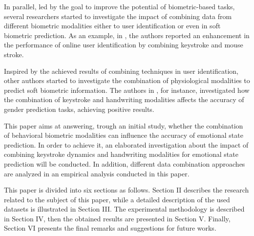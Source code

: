\documentclass[conference]{IEEEtran}
\begin{document}
In parallel, led by the goal to improve the potential of biometric-based tasks, several researchers started to investigate the impact of combining data from different biometric modalities \cite{combine} either to user identification or even in soft biometric prediction. As an example, in \cite{marjorie-comb}, the authors reported an enhancement in the performance of online user identification by combining keystroke and mouse stroke. 

Inspired by the achieved results of combining techniques in user identification, other authors started to investigate the combination of physiological modalities to predict soft biometric information. The authors in \cite{combining-gender}, for instance, investigated how the combination of keystroke and handwriting modalities affects the accuracy of gender prediction tasks, achieving positive results.

This paper aims at answering, trough an initial study, whether the combination of behavioral biometric modalities can influence the accuracy of emotional state prediction. In order to achieve it, an elaborated investigation about the impact of combining keystroke dynamics and handwriting modalities for emotional state prediction will be conducted. In addition, different data combination approaches are analyzed in an empirical analysis conducted in this paper.


This paper is divided into six sections as follows. Section II describes the research related to the subject of this paper, while a detailed description of the used datasets is illustrated in Section III. The experimental methodology is described in Section IV, then the obtained results are presented in Section V. Finally, Section VI presents the final remarks and suggestions for future works. 
\end{document}
